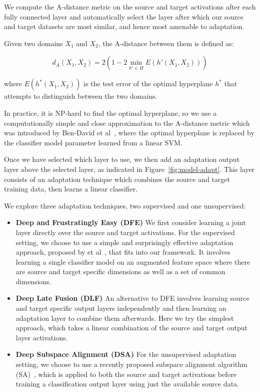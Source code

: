 We compute the A-distance metric on the source and target activations after each fully 
connected layer
and automatically select the  layer after which
our source and target datasets are most similar, and hence most amenable to adaptation.

Given two domains $X_1$ and $X_2$, the A-distance between them is defined as:

\begin{equation}
  d_A(X_1, X_2) = 2 \left( 1 - 2 \min_{h' \in H} E(h'(X_1, X_2))\right)
\end{equation}


where $E(h^*(X_1, X_2))$ is the test error of the optimal hyperplane $h^*$ that attempts to
distinguish between the two domains.

In practice, it is NP-hard to find the optimal hyperplane, so we use a computationally simple and 
close approximation to the A-distance metric which was introduced by Ben-David et al~\cite{adist-comp}, 
where the optimal hyperplane is replaced by the classifier model parameter learned from a linear SVM.

Once we have selected which layer to use, we then add an adaptation output layer above the selected layer, as indicated in Figure~\ref{fig:model-adapt}. This layer
consists of an adaptation technique which combines the source and target
training data, then learns a linear classifier.

We explore three adaptation techniques, two supervised and one unsupervised:
\begin{itemize}
  \item \textbf{Deep and Frustratingly Easy (DFE)}
    We first consider learning a joint layer directly over the source and target
    activations. For the supervised setting, we choose to use a simple and
    surprisingly effective adaptation approach, proposed by \daume
    et al~\cite{daume}, that fits into our framework. It involves learning a
    single classifier model on an augmented feature space where there are source
    and target specific dimensions as well as a set of common dimensions.

  \item \textbf{Deep Late Fusion (DLF)}
    An alternative to DFE involves learning source and target specific
    output layers independently and then learning an adaptation layer to
    combine them afterwards. Here we try the simplest approach, which takes a linear combination of the source
    and target output layer activations.

  \item \textbf{Deep Subspace Alignment (DSA)}
    For the unsupervised adaptation setting, we choose to use a recently
    proposed subspace alignment algorithm (SA)~\cite{sa}, which is applied to
    both the source and target activations before training a classification
    output layer using just the available source data.

\end{itemize}

